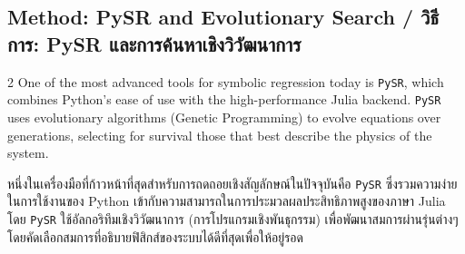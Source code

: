 \subsection{Method: PySR and Evolutionary Search \quad / \quad \textthai{วิธีการ: PySR และการค้นหาเชิงวิวัฒนาการ}}
\begin{paracol}{2}
One of the most advanced tools for symbolic regression today is \texttt{PySR}, which combines Python's ease of use with the high-performance Julia backend. \texttt{PySR} uses evolutionary algorithms (Genetic Programming) to evolve equations over generations, selecting for survival those that best describe the physics of the system.

\switchcolumn

\begin{thai}
หนึ่งในเครื่องมือที่ก้าวหน้าที่สุดสำหรับการถดถอยเชิงสัญลักษณ์ในปัจจุบันคือ \texttt{PySR} ซึ่งรวมความง่ายในการใช้งานของ Python เข้ากับความสามารถในการประมวลผลประสิทธิภาพสูงของภาษา Julia โดย \texttt{PySR} ใช้อัลกอริทึมเชิงวิวัฒนาการ (การโปรแกรมเชิงพันธุกรรม) เพื่อพัฒนาสมการผ่านรุ่นต่างๆ โดยคัดเลือกสมการที่อธิบายฟิสิกส์ของระบบได้ดีที่สุดเพื่อให้อยู่รอด
\end{thai}
\end{paracol}
